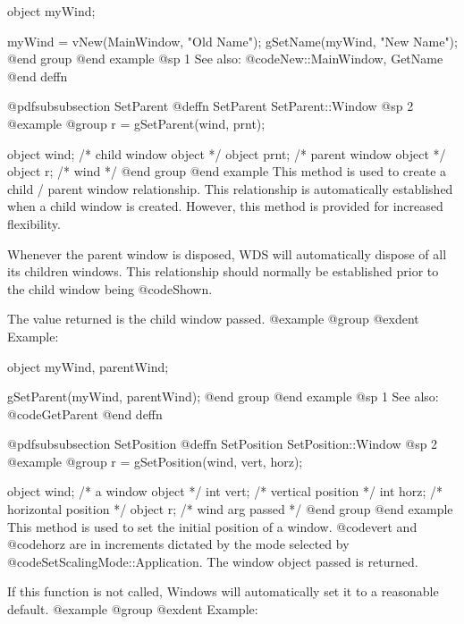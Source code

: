 object  myWind;

myWind = vNew(MainWindow, "Old Name");
gSetName(myWind, "New Name");
@end group
@end example
@sp 1
See also:  @code{New::MainWindow, GetName}
@end deffn













@pdfsubsubsection {SetParent}
@deffn {SetParent} SetParent::Window
@sp 2
@example
@group
r = gSetParent(wind, prnt);

object  wind;   /*  child window object   */
object  prnt;   /*  parent window object  */
object  r;      /*  wind                  */
@end group
@end example
This method is used to create a child / parent window relationship.
This relationship is automatically established when a child window is
created.  However, this method is provided for increased flexibility.

Whenever the parent window is disposed, WDS will automatically dispose
of all its children windows.  This relationship should normally be
established prior to the child window being @code{Shown}.

The value returned is the child window passed.
@example
@group
@exdent Example:

object  myWind, parentWind;

gSetParent(myWind, parentWind);
@end group
@end example
@sp 1
See also:  @code{GetParent}
@end deffn
















@pdfsubsubsection {SetPosition}
@deffn {SetPosition} SetPosition::Window
@sp 2
@example
@group
r = gSetPosition(wind, vert, horz);

object  wind;   /*  a window object     */
int     vert;   /*  vertical position   */
int     horz;   /*  horizontal position */
object  r;      /*  wind arg passed     */
@end group
@end example
This method is used to set the initial position of a window.
@code{vert} and @code{horz} are in increments dictated by the
mode selected by @code{SetScalingMode::Application}.  The window
object passed is returned.

If this function is not called, Windows will automatically set it to a
reasonable default.
@example
@group
@exdent Example:

